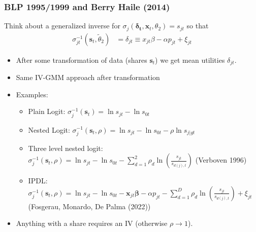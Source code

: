 \documentclass[aspectratio=169,10pt]{beamer}
\begin{document}
\begin{frame}
\frametitle{BLP 1995/1999 and Berry Haile (2014)}
Think about a \alert{generalized inverse} for $\sigma_{j}(\symbf{\delta_{t}}, \symbf{x}_t,\theta_2) = s_{jt}$ so that 
\begin{align*}
 \sigma_{jt}^{-1}(\symbf{s}_t,\widetilde{\theta}_2)&= \delta_{jt} \equiv x_{jt} \beta -\alpha p_{jt} +  \xi_{jt} 
\end{align*}
 \begin{itemize}
\item After some transformation of data (shares $\symbf{s}_t$) we get \alert{mean utilities} $\delta_{jt}$.
\item Same IV-GMM approach after transformation
\item Examples:
\begin{itemize}
\item Plain Logit: $\sigma_{j}^{-1}(\symbf{s}_t) = \ln s_{jt}- \ln s_{0t}$
\item Nested Logit: $\sigma_{j}^{-1}(\symbf{s}_t,\rho) = \ln s_{jt}- \ln s_{0t} - \rho  \ln s_{j|gt}$
\item Three level nested logit: $\sigma_{j}^{-1}(\symbf{s}_t,\rho) = \ln s_{jt}- \ln s_{0t} -\sum_{d=1}^2 \rho_d \ln \left(\frac{s_{jt}}{s_{d(j), t}}\right)$ (Verboven 1996)
\item IPDL: $\sigma_{j}^{-1}(\symbf{s}_t,\rho) = \ln s_{jt}- \ln s_{0t}-\symbf{x}_{j t} \symbf{\beta}-\alpha p_{j t}-\sum_{d=1}^D \rho_d \ln \left(\frac{s_{jt}}{s_{d(j), t}}\right)+\xi_{j t}$\\ (Fosgerau, Monardo, De Palma (2022))
 \end{itemize}
 \item Anything with a share requires an IV (otherwise $\rho \rightarrow 1$).
 \end{itemize}
\end{frame}
\end{document}
